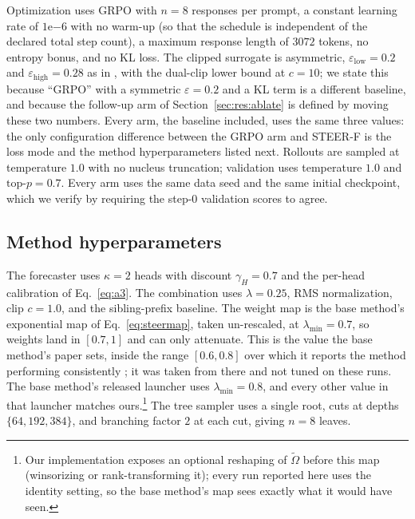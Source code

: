 \documentclass[11pt]{article}
\newcommand{\Omt}{\tilde{\Omega}}
\begin{document}
Optimization uses GRPO \citep{shao2024deepseekmath} with $n = 8$ responses per prompt, a constant learning rate
of $1\mathrm{e}{-6}$ with no warm-up (so that the schedule is independent of the
declared total step count), a maximum response length of $3072$ tokens, no entropy
bonus, and no KL loss. The clipped surrogate \citep{schulman2017proximal} is
asymmetric, $\varepsilon_{\mathrm{low}} = 0.2$ and
$\varepsilon_{\mathrm{high}} = 0.28$ as in \citet{yu2025dapo}, with
the dual-clip lower bound at $c = 10$; we state this because ``GRPO'' with a
symmetric $\varepsilon = 0.2$ and a KL term is a different baseline, and because
the follow-up arm of Section~\ref{sec:res:ablate} is defined by moving these two
numbers. Every arm, the baseline included, uses the same three values: the
only configuration difference between the GRPO arm and STEER-F is the loss mode and
the method hyperparameters listed next. Rollouts are sampled at temperature $1.0$ with no nucleus
truncation; validation uses temperature $1.0$ and $\mathrm{top\text{-}}p = 0.7$.
Every arm uses the same data seed and the same initial checkpoint, which we verify by
requiring the step-$0$ validation scores to agree.

\subsection{Method hyperparameters}

The forecaster uses $\kappa = 2$ heads with discount $\gamma_H = 0.7$ and the
per-head calibration of Eq.~\eqref{eq:a3}. The combination uses $\lambda = 0.25$,
RMS normalization, clip $c = 1.0$, and the sibling-prefix baseline. The weight map
is the base method's exponential map of Eq.~\eqref{eq:steermap}, taken
un-rescaled, at $\lambda_{\min} = 0.7$, so weights land in $[0.7, 1]$ and can only
attenuate. This is the value the base method's paper sets, inside the range $[0.6, 0.8]$ over
which it reports the method performing consistently
\citep[App.~F.1]{steer}; it was taken from there and not tuned on these runs. The
base method's released launcher uses $\lambda_{\min} = 0.8$, and every other value
in that launcher matches ours.\footnote{Our implementation exposes an optional reshaping of
$\Omt$ before this map (winsorizing or rank-transforming it); every run reported
here uses the identity setting, so the base method's map sees exactly what it would
have seen.} The tree sampler uses a single root, cuts at depths
$\{64, 192, 384\}$, and branching factor $2$ at each cut, giving $n = 8$ leaves.
\end{document}
